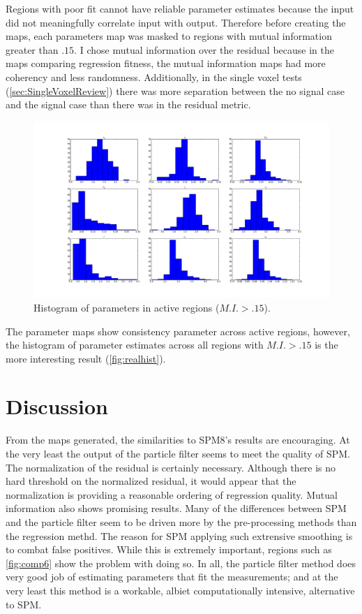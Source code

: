 Regions with poor fit cannot have reliable parameter estimates because the input did not meaningfully
correlate input with output. Therefore before creating the maps,
each parameters map was masked to regions with mutual information greater than $.15$. I chose mutual
information over the residual because in the maps comparing regression fitness, the mutual information
maps had more coherency and less randomness. Additionally, in the single voxel tests (\autoref{sec:SingleVoxelReview}) 
there was more separation between the no signal case and the signal case than there was in the 
residual metric. 

\begin{figure}
\centering
\includegraphics[clip=truew,trim=8cm 4cm 8cm 4cm,width=16cm]{images/realhist}
\caption{Histogram of parameters in active regions ($M.I. > .15$).}
\label{fig:realhist}
\end{figure}

The parameter maps show consistency parameter across active regions, however, 
the histogram of parameter estimates across all regions with $M.I. > .15$ is the
more interesting result (\autoref{fig:realhist}). 

\section{Discussion}
From the maps generated, the similarities to SPM8's results are encouraging. At the 
very least the output of the particle filter seems to meet the quality of SPM. The normalization
of the residual is certainly necessary. Although there is no hard threshold on the 
normalized residual, it would appear that the normalization is providing a reasonable
ordering of regression quality. Mutual information also shows promising results.
Many of the differences between SPM and the particle filter seem to be driven
more by the pre-processing methods than the regression methd. The reason for 
SPM applying such extrensive smoothing is to combat false positives. While this is
extremely important, regions such as \autoref{fig:comp6} show the problem with doing 
so. In all, the particle filter method does very good job of estimating parameters that
fit the measurements; and at the very least this method is a workable, albiet
computationally intensive, alternative to SPM. 
